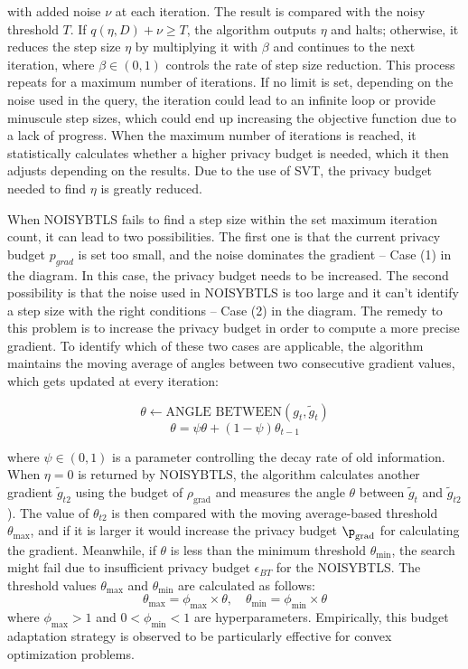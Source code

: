 with added noise \( \nu \) at each iteration. The result is compared with the noisy threshold \( T \). If \( q(\eta,D)+\nu\geq T \), the algorithm outputs \( \eta \) and halts; otherwise, it reduces the step size \( \eta \) by multiplying it with \( \beta \) and continues to the next iteration, where \( \beta\in(0,1) \) controls the rate of step size reduction. This process repeats for a maximum number of iterations. If no limit is set, depending on the noise used in the query, the iteration could lead to an infinite loop or provide minuscule step sizes, which could end up increasing the objective function due to a lack of progress. When the maximum number of iterations is reached, it statistically calculates whether a higher privacy budget is needed, which it then adjusts depending on the results. Due to the use of SVT, the privacy budget needed to find $\eta$ is greatly reduced.

When NOISYBTLS fails to find a step size within the set maximum iteration count, it can lead to two possibilities. The first one is that the current privacy budget $p_{grad}$ is set too small, and the noise dominates the gradient -- Case (1) in the diagram. In this case, the privacy budget needs to be increased. The second possibility is that the noise used in NOISYBTLS is too large and it can’t identify a step size with the right conditions -- Case (2) in the diagram. The remedy to this problem is to increase the privacy budget in order to compute a more precise gradient. To identify which of these two cases are applicable,  the algorithm maintains the moving average of angles between two consecutive gradient values, which gets updated at every iteration:

\[ \theta \leftarrow \text{ANGLE BETWEEN}(g_{t},\tilde{g}_{t})\]
\[\theta = \psi\theta + (1 - \psi)\theta_{t-1} \]

where $\psi \in (0,1)$ is a parameter controlling the decay rate of old information. When $\eta=0$ is returned by NOISYBTLS, the algorithm calculates another gradient $\tilde{g}_{t2}$ using the budget of $\rho_{\text{grad}}$ and measures the angle $\theta$ between $\tilde{g}_t$ and $\tilde{g}_{t2}$). The value of $\theta_{t2}$ is then compared with the moving average-based threshold $\theta_\text{max}$, and if it is larger it would increase the privacy budget $\p_\text{grad}$ for calculating the gradient. Meanwhile, if $\theta$ is less than the minimum threshold $\theta_\text{min}$, the search might fail due to insufficient privacy budget $\epsilon_{BT}$ for the NOISYBTLS. The threshold values $\theta_{\text{max}}$ and $\theta_{\text{min}}$ are calculated as follows:
\[ \theta_{\text{max}} = \phi_{\text{max}} \times \theta, \quad \theta_{\text{min}} = \phi_{\text{min}} \times \theta \]
where $\phi_{\text{max}} > 1$ and $0 < \phi_{\text{min}} < 1$ are hyperparameters. Empirically, this budget adaptation strategy is observed to be particularly effective for convex optimization problems.

